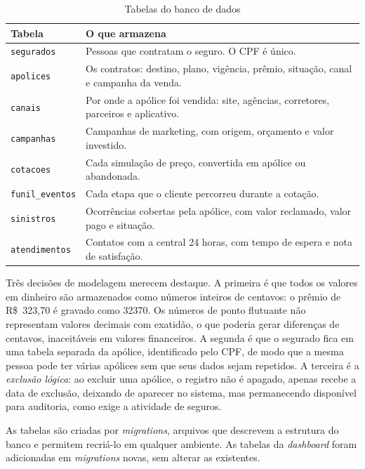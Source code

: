 \documentclass[12pt,a4paper]{article}
\newcommand{\fonte}[1]{\par\vspace{2pt}{\centering\small Fonte: #1\par}}
\begin{document}
\begin{table}[H]
\centering
\caption{Tabelas do banco de dados}\label{tab:tabelas}
\begin{tabularx}{\textwidth}{@{}lX@{}}
\toprule
Tabela & O que armazena \\
\midrule
\texttt{segurados} & Pessoas que contratam o seguro. O CPF é único. \\
\texttt{apolices} & Os contratos: destino, plano, vigência, prêmio, situação, canal e campanha da venda. \\
\texttt{canais} & Por onde a apólice foi vendida: site, agências, corretores, parceiros e aplicativo. \\
\texttt{campanhas} & Campanhas de marketing, com origem, orçamento e valor investido. \\
\texttt{cotacoes} & Cada simulação de preço, convertida em apólice ou abandonada. \\
\texttt{funil\_eventos} & Cada etapa que o cliente percorreu durante a cotação. \\
\texttt{sinistros} & Ocorrências cobertas pela apólice, com valor reclamado, valor pago e situação. \\
\texttt{atendimentos} & Contatos com a central 24 horas, com tempo de espera e nota de satisfação. \\
\bottomrule
\end{tabularx}
\fonte{elaborado pelo autor (2026).}
\end{table}

Três decisões de modelagem merecem destaque. A primeira é que todos os valores em dinheiro são
armazenados como números inteiros de centavos: o prêmio de R\$~323,70 é gravado como 32370. Os
números de ponto flutuante não representam valores decimais com exatidão, o que poderia gerar
diferenças de centavos, inaceitáveis em valores financeiros. A segunda é que o segurado fica em
uma tabela separada da apólice, identificado pelo CPF, de modo que a mesma pessoa pode ter várias
apólices sem que seus dados sejam repetidos. A terceira é a \emph{exclusão lógica}: ao excluir
uma apólice, o registro não é apagado, apenas recebe a data de exclusão, deixando de aparecer no
sistema, mas permanecendo disponível para auditoria, como exige a atividade de seguros.

As tabelas são criadas por \emph{migrations}, arquivos que descrevem a estrutura do banco e
permitem recriá-lo em qualquer ambiente. As tabelas da \emph{dashboard} foram adicionadas em
\emph{migrations} novas, sem alterar as existentes.
\end{document}
